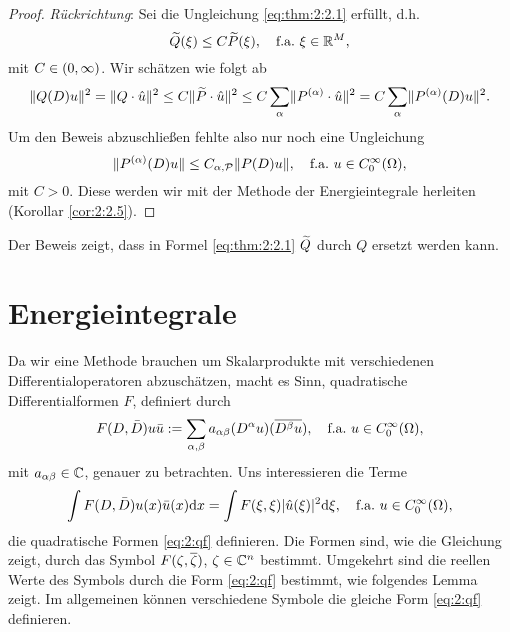 \begin{proof}
{\em Rückrichtung}:
Sei die Ungleichung \eqref{eq:thm:2:2.1} erfüllt, d.h.
\begin{equation}\label{eq:2.10}
\widetilde{Q}(\xi)\leq C\widetilde{P}(\xi),
\quad\text{f.a.}~\xi\in\mathbb R^M,
\end{equation}
mit $C\in(0,\infty)$.
Wir schätzen wie folgt ab
\begin{equation}\label{eq:2.11}
\lVert Q(D)u\rVert^2=\lVert Q\cdot\hat{u}\rVert^2\leq C\lVert\widetilde{P}\cdot\hat{u}\rVert^2
\leq C\sum_{\alpha}\lVert P^{(\alpha)}\cdot\hat{u}\rVert^2=C\sum_\alpha\lVert P^{(\alpha)}(D)u\rVert^2.
\end{equation}
Um den Beweis abzuschließen fehlte also nur noch eine Ungleichung
\begin{equation}
\lVert P^{(\alpha)}(D)u\rVert\leq C_{\alpha,\mathcal P}\lVert P(D)u\rVert,
\quad\text{f.a.}~u\in C^\infty_0(\Omega),
\end{equation}
mit $C>0$.
Diese werden wir mit der Methode der Energieintegrale herleiten (Korollar \ref{cor:2:2.5}).
\end{proof}

Der Beweis zeigt,
dass in Formel \eqref{eq:thm:2:2.1} $\widetilde{Q}$ durch $Q$ ersetzt werden kann.

\section{Energieintegrale}

Da wir eine Methode brauchen um Skalarprodukte
mit verschiedenen Differentialoperatoren abzuschätzen,
macht es Sinn, quadratische Differentialformen $F$, definiert durch
\begin{equation}
F(D,\bar{D})u\bar{u}:=\sum_{\alpha,\beta}a_{\alpha\beta}(D^\alpha u)(\overline{D^\beta u}),
\quad\text{f.a.}~u\in C^\infty_0(\Omega),
\end{equation}
mit $a_{\alpha\beta}\in\mathbb C$, genauer zu betrachten.
Uns interessieren die Terme
\begin{equation}\label{eq:2:qf}
\int F(D,\bar{D})u(x)\bar{u}(x)\mathrm{d} x=\int F(\xi,\xi)\lvert\hat{u}(\xi)\rvert^2\mathrm{d} \xi,
\quad\text{f.a.}~u\in C^\infty_0(\Omega),
\end{equation}
die quadratische Formen \eqref{eq:2:qf} definieren.
Die Formen sind, wie die Gleichung zeigt,
durch das Symbol $F(\zeta,\overline{\zeta})$, $\zeta\in\mathbb C^n$ bestimmt.
Umgekehrt sind die reellen Werte des Symbols
durch die Form \eqref{eq:2:qf} bestimmt,
wie folgendes Lemma zeigt.
Im allgemeinen können verschiedene Symbole
die gleiche Form \eqref{eq:2:qf} definieren.

